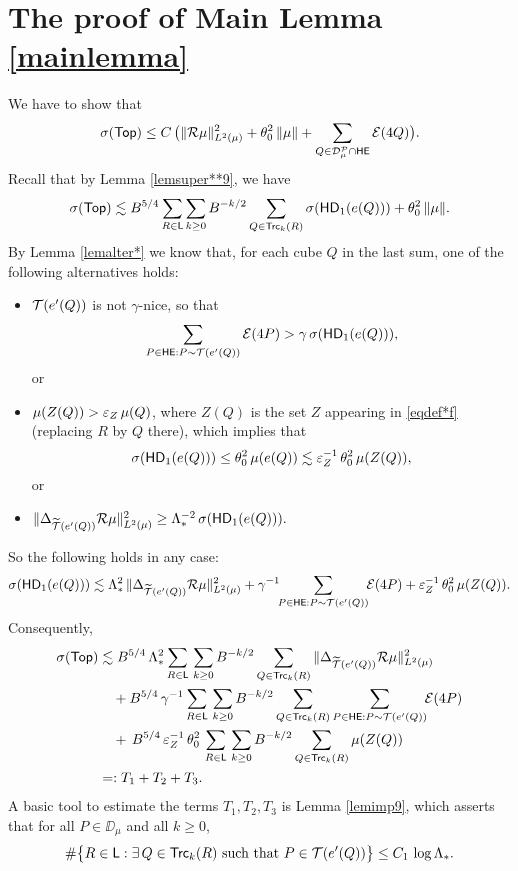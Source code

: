 
\section{The proof of Main Lemma \ref{mainlemma}}\label{sec8}

We have to show that
$$\sigma({\mathsf {Top}})\leq C\,\big(\|{\mathcal R}\mu\|_{L^2(\mu)}^2 + \theta_0^2\,\|\mu\|
+ \sum_{Q\in{\mathcal D}_\mu^{\mathcal P}\cap{\mathsf {HE}}}{\mathcal E}(4Q)\big).$$
Recall that by Lemma \ref{lemsuper**9}, we have
$$\sigma({\mathsf {Top}}) \lesssim B^{5/4} \sum_{R\in {\mathsf{L}}} \sum_{k\geq0} B^{-k/2}\sum_{Q\in{\mathsf{Trc}}_k(R)}\sigma({\mathsf{HD}}_1(e(Q))) + \theta_0^2\,\|\mu\|.$$
By Lemma \ref{lemalter*} we know that, for each cube $Q$ in the last sum, one of the following alternatives holds:
\begin{itemize}
\item 
${\mathcal T}(e'(Q))$ is not $\gamma$-nice, so that
$$\sum_{P\in{\mathsf {HE}}:P\sim{\mathcal T}(e'(Q))} {\mathcal E}(4P) >\gamma \,\sigma({\mathsf{HD}}_1(e(Q))),$$ or
\vv

\item $\mu(Z(Q))> {\varepsilon}_Z\,\mu(Q)$,\; where $Z(Q)$ is the set $Z$ appearing in \eqref{eqdef*f} (replacing $R$ by $Q$ there), which implies that
$$\sigma({\mathsf{HD}}_1(e(Q)))\leq \theta_0^2\,\mu(e(Q)) \lesssim {\varepsilon}_Z^{-1}\,\theta_0^2\,\mu(Z(Q)),$$
or
\vv

\item
$\|\Delta_{{\widetilde{{\mathcal T}}}(e'(Q))} {\mathcal R}\mu\|_{L^2(\mu)}^2\geq \Lambda_*^{-2}\,\sigma({\mathsf{HD}}_1(e(Q))).$
\end{itemize}


So the following holds in any case:
$$\sigma({\mathsf{HD}}_1(e(Q)))\lesssim \Lambda_*^2\,\|\Delta_{{\widetilde{{\mathcal T}}}(e'(Q))} {\mathcal R}\mu\|_{L^2(\mu)}^2+ \gamma^{-1}\!\!\sum_{P\in{\mathsf {HE}}:P\sim{\mathcal T}(e'(Q))} \!\!{\mathcal E}(4P) + {\varepsilon}_Z^{-1}\, \theta_0^2\,\mu(Z(Q)).$$
Consequently,
\begin{align}\label{eqsumtot93}
\sigma({\mathsf {Top}}) & \lesssim  B^{5/4}\,\Lambda_*^2
\sum_{R\in{\mathsf{L}}}\,  \sum_{k\geq0} B^{-k/2}\sum_{Q\in{\mathsf{Trc}}_k(R)}
\|\Delta_{{\widetilde{{\mathcal T}}}(e'(Q))} {\mathcal R}\mu\|_{L^2(\mu)}^2\\
&\quad+ B^{5/4}\,
\gamma^{-1}
\sum_{R\in{\mathsf{L}}}\,  \sum_{k\geq0} B^{-k/2}\sum_{Q\in{\mathsf{Trc}}_k(R)}
\sum_{P\in{\mathsf {HE}}:P\sim{\mathcal T}(e'(Q))} \!\!{\mathcal E}(4P)\nonumber\\
&\quad+ \,B^{5/4}\,
{\varepsilon}_Z^{-1}\, \theta_0^2\,
\sum_{R\in{\mathsf{L}}}\,  \sum_{k\geq0} B^{-k/2}\sum_{Q\in{\mathsf{Trc}}_k(R)}
\mu(Z(Q))\nonumber\\
&=: T_1 + T_2 + T_3.\nonumber
\end{align}
A basic tool to estimate the terms $T_1,T_2,T_3$ is Lemma \ref{lemimp9}, which asserts that
 for all $P\in\DD_\mu$ and all $k\geq0$,
$$\#\big\{R\in{\mathsf{L}}:\exists \,Q\in{\mathsf{Trc}}_k(R) \mbox{ such that } P\in{\mathcal T}(e'(Q))\big\}\leq C_1\,\log\Lambda_*.$$





